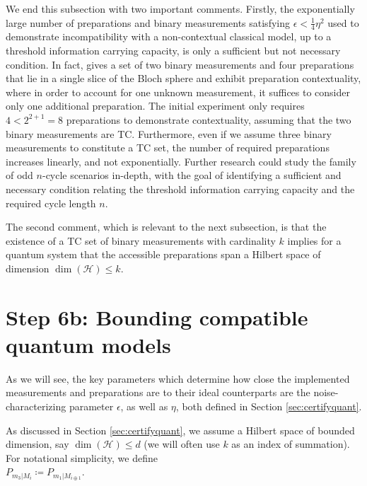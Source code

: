 We end this subsection with two important comments. Firstly, the exponentially large number of preparations and binary measurements satisfying $\epsilon<\frac{1}{4}\eta^2$ used to demonstrate incompatibility with a non-contextual classical model, up to a threshold information carrying capacity, is only a sufficient but not necessary condition. In fact, \cite{Pusey2019a} gives a set of two binary measurements and four preparations that lie in a single slice of the Bloch sphere and exhibit preparation contextuality, where in order to account for one unknown measurement, it suffices to consider only one additional preparation. The initial experiment only requires $4<2^{2+1}=8$ preparations to demonstrate contextuality, assuming that the two binary measurements are TC. Furthermore, even if we assume three binary measurements to constitute a TC set, the number of required preparations increases linearly, and not exponentially. Further research could study the family of odd $n$-cycle scenarios in-depth, with the goal of identifying a sufficient and necessary condition relating the threshold information carrying capacity and the required cycle length $n$.

The second comment, which is relevant to the next subsection, is that the existence of a TC set of binary measurements with cardinality $k$ implies for a quantum system that the accessible preparations span a Hilbert space of dimension $\operatorname{dim}(\mathcal{H})\leq k$.

\section{Step 6b: Bounding compatible quantum models}
\label{sec:boundingmodels}

As we will see, the key parameters which determine how close the implemented measurements and preparations are to their ideal counterparts are the noise-characterizing parameter $\epsilon$, as well as $\eta$, both defined in Section \ref{sec:certifyquant}.
  
As discussed in Section \ref{sec:certifyquant}, we assume a Hilbert space of bounded dimension, say $\operatorname{dim}(\mathcal{H})\leq d$ (we will often use $k$ as an index of summation). For notational simplicity, we define\\$P_{m_3\vert M_i}\coloneqq P_{m_1\vert M_{i\oplus 1}}$.

